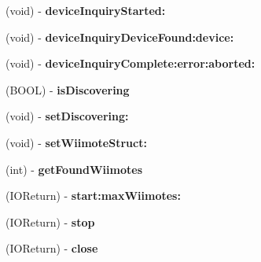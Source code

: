 \begin{DoxyCompactItemize}
\item 
\hypertarget{interface_wii_search_ade01f115383cdd698af8927f28f63b1d}{(void) -\/ {\bfseries device\-Inquiry\-Started\-:}}\label{interface_wii_search_ade01f115383cdd698af8927f28f63b1d}

\item 
\hypertarget{interface_wii_search_a0657d3778a59f06a7e88f384bcbdef15}{(void) -\/ {\bfseries device\-Inquiry\-Device\-Found\-:device\-:}}\label{interface_wii_search_a0657d3778a59f06a7e88f384bcbdef15}

\item 
\hypertarget{interface_wii_search_ad98054ad882cc29eb6f216cd0bcddb0b}{(void) -\/ {\bfseries device\-Inquiry\-Complete\-:error\-:aborted\-:}}\label{interface_wii_search_ad98054ad882cc29eb6f216cd0bcddb0b}

\item 
\hypertarget{interface_wii_search_aa33564fade7c3c1e01db4262d212e260}{(B\-O\-O\-L) -\/ {\bfseries is\-Discovering}}\label{interface_wii_search_aa33564fade7c3c1e01db4262d212e260}

\item 
\hypertarget{interface_wii_search_a6db4e4c477d44817ac956aa969ffe5eb}{(void) -\/ {\bfseries set\-Discovering\-:}}\label{interface_wii_search_a6db4e4c477d44817ac956aa969ffe5eb}

\item 
\hypertarget{interface_wii_search_a9f7f99922440f3ebcad9cead56963bed}{(void) -\/ {\bfseries set\-Wiimote\-Struct\-:}}\label{interface_wii_search_a9f7f99922440f3ebcad9cead56963bed}

\item 
\hypertarget{interface_wii_search_a3bd54d2537185d929a0b999d01495845}{(int) -\/ {\bfseries get\-Found\-Wiimotes}}\label{interface_wii_search_a3bd54d2537185d929a0b999d01495845}

\item 
\hypertarget{interface_wii_search_ae02df9b6a334bd5fba04210d618fadd5}{(I\-O\-Return) -\/ {\bfseries start\-:max\-Wiimotes\-:}}\label{interface_wii_search_ae02df9b6a334bd5fba04210d618fadd5}

\item 
\hypertarget{interface_wii_search_ac0561a24f7d404d599761133808e72e7}{(I\-O\-Return) -\/ {\bfseries stop}}\label{interface_wii_search_ac0561a24f7d404d599761133808e72e7}

\item 
\hypertarget{interface_wii_search_ad3ca7558f3482774717d91da8a879c1c}{(I\-O\-Return) -\/ {\bfseries close}}\label{interface_wii_search_ad3ca7558f3482774717d91da8a879c1c}


\end{DoxyCompactItemize}
